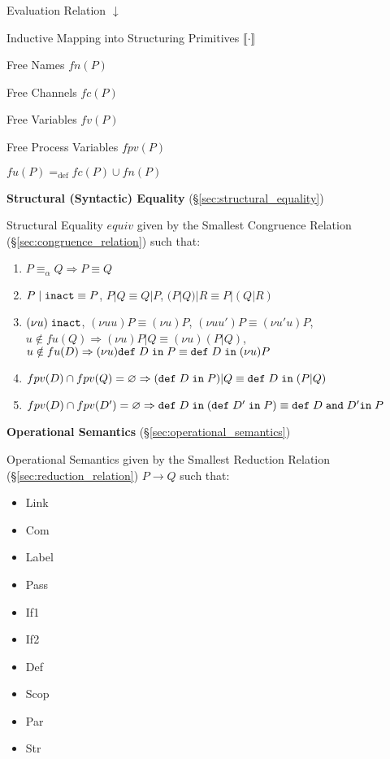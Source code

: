 Evaluation Relation $\downarrow$

Inductive Mapping into Structuring Primitives $\llbracket \cdot
\rrbracket$

Free Names $fn(P)$

Free Channels $fc(P)$

Free Variables $fv(P)$

Free Process Variables $fpv(P)$

$fu(P) =_{\text{def}} fc(P) \cup fn(P)$


\textbf{Structural (Syntactic) Equality}
(\S\ref{sec:structural_equality})
\cite{honda-vasconcelos-kubo98}

Structural Equality $equiv$ given by the Smallest Congruence Relation
(\S\ref{sec:congruence_relation}) such that:
\begin{enumerate}
  \item $P \equiv_\alpha Q \Rightarrow P \equiv Q$
  \item $P \;|\; \mathtt{inact} \equiv P$, \quad\quad $P | Q \equiv Q
    | P$, \quad\quad $(P|Q)|R \equiv P|(Q|R)$
  \item $(\nu u) \; \mathtt{inact}$, \quad
    $(\nu u u)P \equiv (\nu u)P$, \quad
    $(\nu u u')P \equiv (\nu u' u)P$, \\
    $u \notin fu(Q) \Rightarrow (\nu u)P | Q \equiv (\nu u)(P|Q)$, \\
    $u \notin fu(D) \Rightarrow
    (\nu u) \mathtt{def} \; D \; \mathtt{in} \; P
    \equiv \mathtt{def} \; D \; \mathtt{in} \; (\nu u)P$
  \item $fpv(D) \cap fpv(Q) = \varnothing \Rightarrow
    (\mathtt{def} \; D \; \mathtt{in} \; P) | Q
    \equiv \mathtt{def} \; D \; \mathtt{in} \; (P|Q)$
  \item $fpv(D) \cap fpv(D') = \varnothing \Rightarrow
    \mathtt{def} \; D \; \mathtt{in} \;
    (\mathtt{def} \; D' \; \mathtt{in} \; P)
    \equiv \mathtt{def} \; D \; \mathtt{and} \; D' \mathtt{in} \; P$
\end{enumerate}


\textbf{Operational Semantics} (\S\ref{sec:operational_semantics})
\cite{honda-vasconcelos-kubo98}

Operational Semantics given by the Smallest Reduction Relation
(\S\ref{sec:reduction_relation}) $P \rightarrow Q$ such that:

\begin{itemize}
  \item Link
  \item Com
  \item Label
  \item Pass
  \item If1
  \item If2
  \item Def
  \item Scop
  \item Par
  \item Str
\end{itemize}

